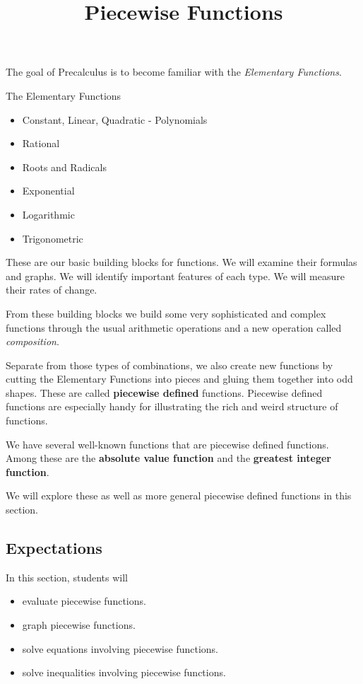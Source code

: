 \documentclass{ximera}
\title{Piecewise Functions}
\begin{document}
\begin{abstract}
\end{abstract}
\maketitle



The goal of Precalculus is to become familiar with the \textit{Elementary Functions}. 


\begin{summary} The Elementary Functions
	\begin{itemize}
		\item Constant, Linear, Quadratic - Polynomials
		\item Rational
		\item Roots and Radicals
		\item Exponential
		\item Logarithmic
		\item Trigonometric
	\end{itemize}
\end{summary}




These are our basic building blocks for functions.  We will examine their formulas and graphs.  We will identify important features of each type. We will measure their rates of change. 

From these building blocks we build some very sophisticated and complex functions through the usual arithmetic operations and a new operation called \textit{composition}. 

Separate from those types of combinations, we also create new functions by cutting the Elementary Functions into pieces and gluing them together into odd shapes.   These are called \textbf{piecewise defined} functions.  Piecewise defined functions are especially handy for illustrating the rich and weird structure of functions.


We have several well-known functions that are piecewise defined functions. Among these are the \textbf{absolute value function} and the \textbf{greatest integer function}.

We will explore these as well as more general piecewise defined functions in this section. \\






\subsection{Expectations}



\begin{sectionOutcomes}
In this section, students will 

\begin{itemize}
\item evaluate piecewise functions.
\item graph piecewise functions.
\item solve equations involving piecewise functions.
\item solve inequalities involving piecewise functions.
\end{itemize}
\end{sectionOutcomes}
\end{document}

